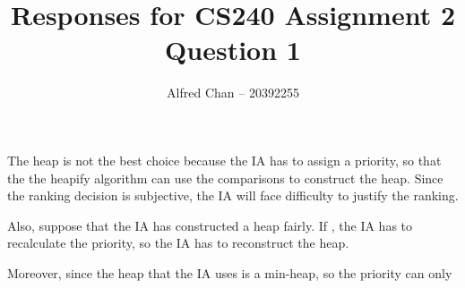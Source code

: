 \documentclass[12pt]{article}
\title{Responses for CS240 Assignment 2 Question 1}
\author{Alfred Chan -- 20392255}
\begin{document}
\lstset{
	language=bash,
	numbers=left,
	showspaces=false,
	showstringspaces=false,
	stepnumber=1,
	basicstyle=\ttfamily,
	frame=single,
	breaklines=true,
	tabsize=2
}

The heap is not the best choice because the IA has to assign a priority, so that the the heapify algorithm can use the comparisons to construct the heap.
Since the ranking decision is subjective, the IA will face difficulty to justify the ranking.

Also, suppose that the IA has constructed a heap fairly. 
If , the IA has to recalculate the priority, so the IA has to reconstruct the heap.

Moreover, since the heap that the IA uses is a min-heap, so the priority can only
\end{document}
